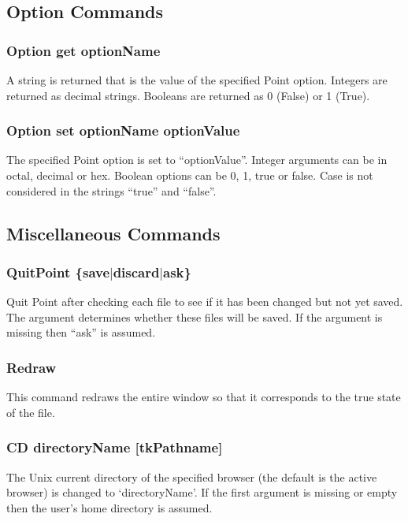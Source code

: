 \subsection{ Option Commands }

\subsubsection{Option get optionName}
A string is returned that is the value of the specified
Point option.
Integers are returned as decimal strings.
Booleans are returned as 0 (False) or 1 (True).

\subsubsection{Option set optionName optionValue}
The specified Point option is set to ``optionValue''.
Integer arguments can be in octal, decimal or hex.
Boolean options can be 0, 1, true or false.
Case is not considered in the strings ``true'' and ``false''.





\subsection{Miscellaneous Commands}

\subsubsection{QuitPoint \{save$\mid$discard$\mid$ask\}}
Quit Point after checking each file to see if it has been changed
but not yet saved.
The argument determines whether these files will be saved.
If the argument is missing then ``ask'' is assumed.

\subsubsection{Redraw}
This command redraws the entire window so that it corresponds to
the true state of the file.

\subsubsection{CD directoryName [tkPathname]}
The Unix current directory of the specified browser
(the default is the active browser) is changed to `directoryName'.
If the first argument is missing or empty then the user's home directory
is assumed.

